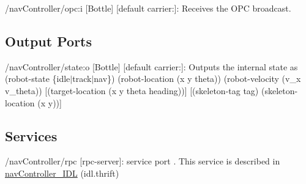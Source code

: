 \begin{DoxyItemize}
\item /nav\+Controller/opc\+:i \mbox{[}Bottle\mbox{]} \mbox{[}default carrier\+:\mbox{]}\+: Receives the O\+PC broadcast.
\end{DoxyItemize}\hypertarget{group__skeletonViewer_outputports_sec}{}\subsection{Output Ports}\label{group__skeletonViewer_outputports_sec}

\begin{DoxyItemize}
\item /nav\+Controller/state\+:o \mbox{[}Bottle\mbox{]} \mbox{[}default carrier\+:\mbox{]}\+: Outputs the internal state as (robot-\/state \{idle$\vert$track$\vert$nav\}) (robot-\/location (x y theta)) (robot-\/velocity (v\+\_\+x v\+\_\+theta)) \mbox{[}(target-\/location (x y theta heading))\mbox{]} \mbox{[}(skeleton-\/tag tag) (skeleton-\/location (x y))\mbox{]}
\end{DoxyItemize}\hypertarget{group__skeletonViewer_services_sec}{}\subsection{Services}\label{group__skeletonViewer_services_sec}

\begin{DoxyItemize}
\item /nav\+Controller/rpc \mbox{[}rpc-\/server\mbox{]}\+: service port . This service is described in \hyperlink{classnavController__IDL}{nav\+Controller\+\_\+\+I\+DL} (idl.\+thrift) 
\end{DoxyItemize}